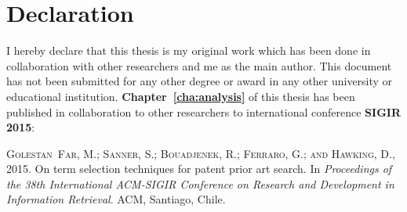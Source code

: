 \chapter*{Declaration}
\vspace{-1em}
I hereby declare that this thesis is my original work which has been done in 
collaboration with other researchers and me as the main author. This document has
not been submitted for any other degree or award in any other university or educational 
institution. \textbf{Chapter~\ref{cha:analysis}} of this thesis has been published in collaboration to other
researchers to international conference \textbf{SIGIR 2015}:
\begin{itemize}
\textsc{Golestan~Far, M.; Sanner, S.; Bouadjenek, R.; Ferraro, G.; and Hawking,
  D.}, 2015.
\newblock On term selection techniques for patent prior art search.
\newblock In \emph{Proceedings of the 38th International ACM-SIGIR Conference
  on Research and Development in Information Retrieval}. ACM, Santiago, Chile.
\end{itemize}


